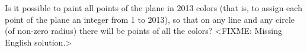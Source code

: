 \problem{}
Is it possible to paint all points of the plane in 2013 colors (that is, to assign each point of the plane an integer from 1 to 2013), so that on any line and any circle (of non-zero radius) there will be points of all the colors?
\solution
<FIXME: Missing English solution.>
\endproblem
